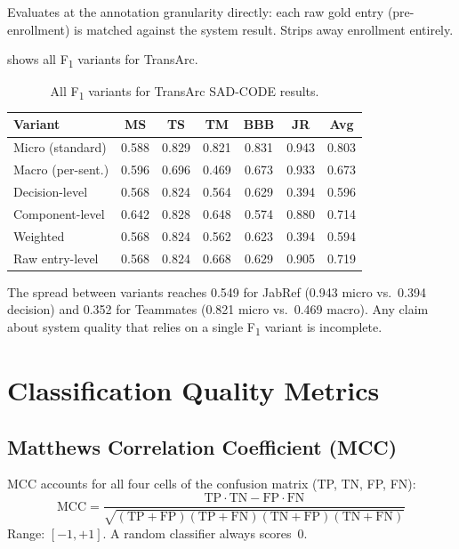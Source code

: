 \documentclass[11pt,a4paper]{report}
\newcommand{\sadcode}{SAD-CODE\xspace}
\newcommand{\transarc}{TransArc\xspace}
\newcommand{\fone}{F\textsubscript{1}\xspace}
\begin{document}
Evaluates at the annotation granularity directly: each raw gold entry
(pre-enrollment) is matched against the system result. Strips away enrollment
entirely.

 shows all \fone variants for \transarc.

\begin{table}[h]
\caption{All \fone variants for \transarc \sadcode results.}
\label{tab:f1_variants}
\centering\small
\begin{tabular}{lcccccc}
\toprule
\textbf{Variant} & \textbf{MS} & \textbf{TS} & \textbf{TM} & \textbf{BBB} & \textbf{JR} & \textbf{Avg} \\
\midrule
Micro (standard)   & 0.588 & 0.829 & 0.821 & 0.831 & 0.943 & 0.803 \\
Macro (per-sent.)  & 0.596 & 0.696 & 0.469 & 0.673 & 0.933 & 0.673 \\
Decision-level     & 0.568 & 0.824 & 0.564 & 0.629 & 0.394 & 0.596 \\
Component-level    & 0.642 & 0.828 & 0.648 & 0.574 & 0.880 & 0.714 \\
Weighted           & 0.568 & 0.824 & 0.562 & 0.623 & 0.394 & 0.594 \\
Raw entry-level    & 0.568 & 0.824 & 0.668 & 0.629 & 0.905 & 0.719 \\
\bottomrule
\end{tabular}
\end{table}

The spread between variants reaches 0.549 for JabRef (0.943 micro vs.\ 0.394
decision) and 0.352 for Teammates (0.821 micro vs.\ 0.469 macro). Any claim
about system quality that relies on a single \fone variant is incomplete.


\section{Classification Quality Metrics}
\label{sec:eval:classification}

\subsection{Matthews Correlation Coefficient (MCC)}

MCC accounts for all four cells of the confusion matrix (TP, TN, FP, FN):
\[
\text{MCC} = \frac{\text{TP}\cdot\text{TN} - \text{FP}\cdot\text{FN}}
{\sqrt{(\text{TP}{+}\text{FP})(\text{TP}{+}\text{FN})(\text{TN}{+}\text{FP})(\text{TN}{+}\text{FN})}}
\]
Range: $[-1,+1]$. A random classifier always scores~0.
\end{document}
